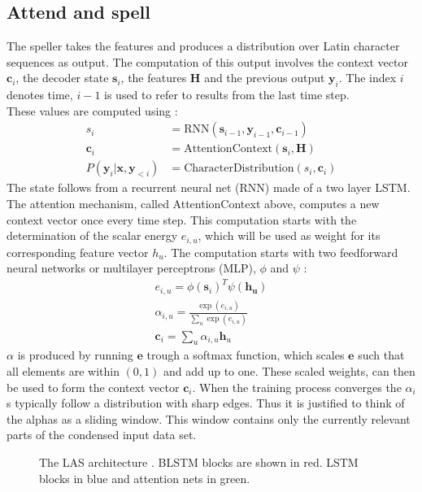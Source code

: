 \subsection{Attend and spell}
The speller takes the features and produces a distribution over Latin character sequences as output. The computation of this output involves the context vector $\mathbf{c}_i$, the decoder state $\mathbf{s}_i$, the features $\mathbf{H}$ and the previous output $\mathbf{y}_i$. The index $i$ denotes time, $i-1$ is used to refer to results from the last time step. \\
These values are computed using \cite[page 4]{Chan2015}:
\begin{align}
 s_i &= \text{RNN}(\mathbf{s}_{i-1}, \mathbf{y}_{i-1}, \mathbf{c}_{i-1}) \\
 \mathbf{c}_i &= \text{AttentionContext}(\mathbf{s}_i,\mathbf{H}) \\
  P(\mathbf{y}_i|\mathbf{x}, \mathbf{y}_{<i}) &= \text{CharacterDistribution}(s_i,\textbf{c}_i)
\end{align}
The state follows from a recurrent neural net (RNN) made of a two layer LSTM.
The attention mechanism, called AttentionContext above, computes a new context vector once every time step.
This computation starts with the determination of the scalar energy $e_{i,u}$, which will be used as weight for its corresponding feature vector  $h_u$. The computation starts with two feedforward neural networks or multilayer perceptrons (MLP), $\phi$ and $\psi$ \cite[page 5]{Chan2015}:
\begin{align}
e_{i,u} = \phi(\mathbf{s}_i)^T \psi(\mathbf{h_u}) \\
\alpha_{i,u} = \frac{ \exp(e_{i,u})}{ \sum\limits_{u} \exp(e_{i,u})} \\
\mathbf{c}_i = \sum\limits_{u} \alpha_{i,u} \mathbf{h}_u
\end{align}
$\alpha$ is produced by running $\mathbf{e}$ trough a softmax function, which scales $\mathbf{e}$ such that all elements are within $(0,1)$ and add up to one. These scaled weights, can then be used to form the context vector $\mathbf{c}_i$. When the training process converges the $\alpha_i$s typically follow a distribution with sharp edges\cite[page 5]{Chan2015}. Thus it is justified to think of the alphas as a sliding window. This window contains only the currently relevant parts of the condensed input data set.

\begin{figure}

\caption{The LAS architecture \cite[page 3]{Chan2015}. BLSTM blocks are shown in red. LSTM blocks in blue and attention nets in green.}
\label{fig:las}
\end{figure}

